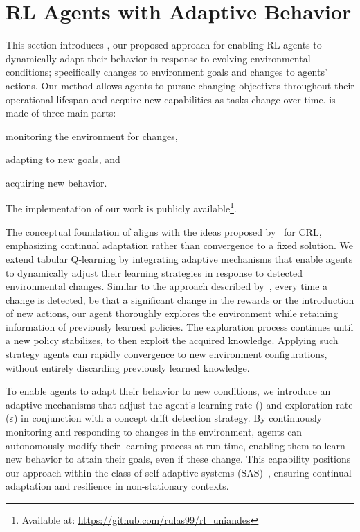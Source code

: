 
\section{\ac{RL} Agents with Adaptive Behavior}
\label{sec:implementation}

This section introduces \adaptiverl, our proposed approach for enabling \ac{RL} agents to dynamically 
adapt their behavior in response to evolving environmental conditions; specifically changes to 
environment goals and changes to agents' actions. Our method allows agents to pursue changing 
objectives throughout their operational lifespan and acquire new capabilities as tasks change over 
time. \adaptiverl is made of three main parts:
\begin{enumerate*}[label=(\arabic*)]
\item monitoring the environment for changes,
\item adapting to new goals, and
\item acquiring new behavior.
\end{enumerate*}
The implementation of our work is publicly available\footnote{Available at: \url{https://github.com/rulas99/rl_uniandes}}.

The conceptual foundation of \adaptiverl aligns with the ideas proposed 
by~\citet{abel2023definitioncontinualreinforcementlearning} for \ac{CRL}, emphasizing continual 
adaptation rather than convergence to a fixed solution. We extend tabular Q-learning by integrating 
adaptive mechanisms that enable agents to dynamically adjust their learning strategies in response 
to detected environmental changes. Similar to the approach described 
by~\citet{norman2024firstexploreexploitmetalearningsolve}, every time a change is detected, be that 
a significant change in the rewards or the introduction of new actions, our agent thoroughly explores 
the environment while retaining information of previously learned policies. The exploration process 
continues until a new policy stabilizes, to then exploit the acquired knowledge. Applying such strategy 
agents can rapidly convergence to new environment configurations, without entirely discarding 
previously learned knowledge.

To enable agents to adapt their behavior to new conditions, we introduce an adaptive mechanisms 
that adjust the agent's learning rate (\lrate{\alpha}) and exploration rate ($\varepsilon$) in conjunction 
with a concept drift detection strategy. By continuously monitoring and responding to changes in the 
environment, agents can autonomously modify their learning process at run time, enabling them 
to learn new behavior to attain their goals, even if these change. This capability positions our approach 
within the class of self-adaptive systems (SAS)~\cite{sasreview}, ensuring continual adaptation and 
resilience in non-stationary contexts.

